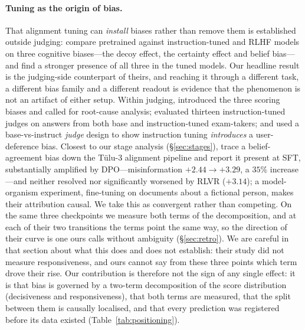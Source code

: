 \documentclass[11pt]{article}
\begin{document}
\paragraph{Tuning as the origin of bias.} That alignment tuning can \emph{install}
biases rather than remove them is established outside judging:
\citet{itzhak2024instructed} compare pretrained against instruction-tuned and RLHF
models on three cognitive biases---the decoy effect, the certainty effect and
belief bias---and find a stronger presence of all three in the tuned models. Our
headline result is the judging-side counterpart of theirs, and reaching it through
a different task, a different bias family and a different readout is evidence that
the phenomenon is not an artifact of either setup. Within judging,
\citet{li2025scoring} introduced the three scoring biases and called for root-cause
analysis; \citet{thakur2024judging} evaluated
thirteen instruction-tuned judges on answers from both base and instruction-tuned
exam-takers; and \citet{pan2025user}
used a base-vs-instruct \emph{judge} design to show instruction tuning
\emph{introduces} a user-deference bias. Closest to our stage analysis
(\S\ref{sec:stages}), \citet{zahraei2026prior} trace a belief-agreement bias down
the T\"ulu-3 alignment pipeline and report it present at SFT, substantially
amplified by DPO---misinformation $+2.44 \to +3.29$, a $35\%$ increase---and
neither resolved nor significantly worsened by RLVR ($+3.14$); a model-organism
experiment, fine-tuning on documents about a fictional person, makes their
attribution causal. We take this as convergent rather than competing. On the same
three checkpoints we measure both terms of the decomposition, and at each of
their two transitions the terms point the same way, so the direction of their
curve is one ours calls without ambiguity (\S\ref{sec:retro}). We are careful
in that section about what this does and does not establish: their study did not
measure responsiveness, and ours cannot say from these three points which term
drove their rise. Our contribution is therefore not
the sign of any single effect: it is that bias is governed by a two-term
decomposition of the score distribution (decisiveness and responsiveness), that
both terms are measured, that the split between them is causally localised, and
that every prediction was registered before its data existed
(Table~\ref{tab:positioning}).
\end{document}
